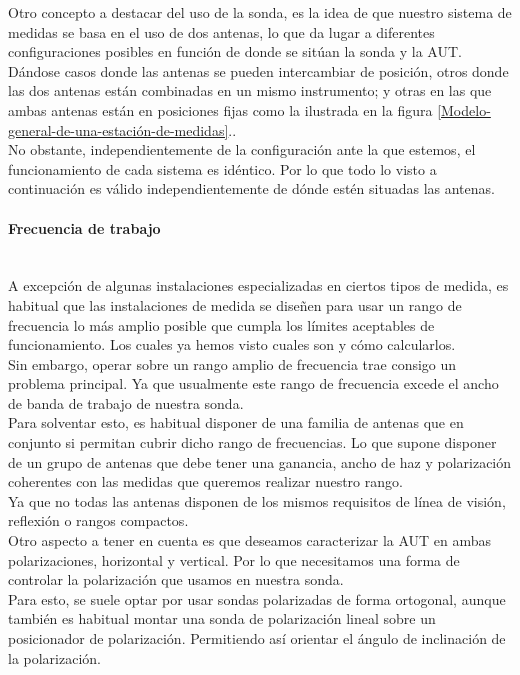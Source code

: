 \documentclass{article}
\newcommand{\myparagraph}[1]{\paragraph{#1}\mbox{}\\}
\begin{document}
Otro concepto a destacar del uso de la sonda, es la idea de que nuestro sistema de medidas se basa en el uso de dos antenas, lo que da lugar a diferentes configuraciones posibles en función de donde se sitúan la sonda y la AUT.\\
Dándose casos donde las antenas se pueden intercambiar de posición, otros donde las dos antenas están combinadas en un mismo instrumento; y otras en las que ambas antenas están en posiciones fijas como la ilustrada en la figura \ref{Modelo-general-de-una-estación-de-medidas}..
\\

No obstante, independientemente de la configuración ante la que estemos, el funcionamiento de cada sistema es idéntico. Por lo que todo lo visto a continuación es válido independientemente de dónde estén situadas las antenas. 

\myparagraph{Frecuencia de trabajo}
A excepción de algunas instalaciones especializadas en ciertos tipos de medida, es habitual que las instalaciones de medida se diseñen para usar un rango de frecuencia lo más amplio posible que cumpla los límites aceptables de funcionamiento. Los cuales ya hemos visto cuales son y cómo calcularlos.
\\
Sin embargo, operar sobre un rango amplio de frecuencia trae consigo un problema principal. Ya que usualmente este rango de frecuencia excede el ancho de banda de trabajo de nuestra sonda. 
\\

Para solventar esto, es habitual disponer de una familia de antenas que en conjunto si permitan cubrir dicho rango de frecuencias. Lo que supone disponer de un grupo de antenas que debe tener una ganancia, ancho de haz y polarización coherentes con las medidas que queremos realizar nuestro rango.\\
Ya que no todas las antenas disponen de los mismos requisitos de línea de visión, reflexión o rangos compactos.
\\

Otro aspecto a tener en cuenta es que deseamos caracterizar la AUT en ambas polarizaciones, horizontal y vertical. Por lo que necesitamos una forma de controlar la polarización que usamos en nuestra sonda.\\
Para esto, se suele optar por usar sondas polarizadas de forma ortogonal, aunque también es habitual montar una sonda de polarización lineal sobre un posicionador de polarización. Permitiendo así orientar el ángulo de inclinación de la polarización.
\end{document}
